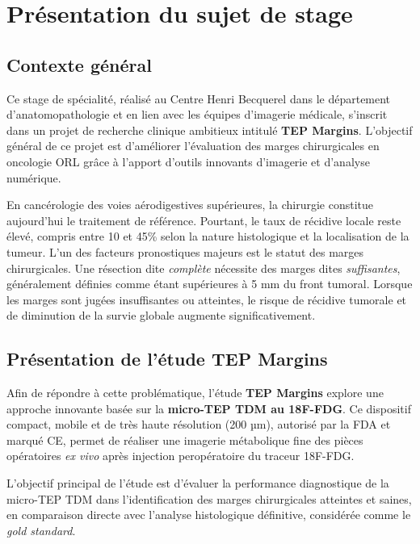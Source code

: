 \documentclass[12pt,a4paper]{report}
\begin{document}
\section{Présentation du sujet de stage}

\subsection{Contexte général}

Ce stage de spécialité, réalisé au Centre Henri Becquerel dans le département d'anatomopathologie et en lien avec les équipes d'imagerie médicale, s'inscrit dans un projet de recherche clinique ambitieux intitulé \textbf{TEP Margins}. L'objectif général de ce projet est d'améliorer l'évaluation des marges chirurgicales en oncologie ORL grâce à l'apport d'outils innovants d'imagerie et d'analyse numérique.

En cancérologie des voies aérodigestives supérieures, la chirurgie constitue aujourd'hui le traitement de référence. Pourtant, le taux de récidive locale reste élevé, compris entre 10 et 45\% selon la nature histologique et la localisation de la tumeur. L'un des facteurs pronostiques majeurs est le statut des marges chirurgicales. Une résection dite \textit{complète} nécessite des marges dites \textit{suffisantes}, généralement définies comme étant supérieures à 5 mm du front tumoral. Lorsque les marges sont jugées insuffisantes ou atteintes, le risque de récidive tumorale et de diminution de la survie globale augmente significativement.

\subsection{Présentation de l'étude TEP Margins}

Afin de répondre à cette problématique, l'étude \textbf{TEP Margins} explore une approche innovante basée sur la \textbf{micro-TEP TDM au 18F-FDG}. Ce dispositif compact, mobile et de très haute résolution (200 µm), autorisé par la FDA et marqué CE, permet de réaliser une imagerie métabolique fine des pièces opératoires \textit{ex vivo} après injection peropératoire du traceur 18F-FDG.

L'objectif principal de l'étude est d'évaluer la performance diagnostique de la micro-TEP TDM dans l'identification des marges chirurgicales atteintes et saines, en comparaison directe avec l'analyse histologique définitive, considérée comme le \textit{gold standard}.
\end{document}
